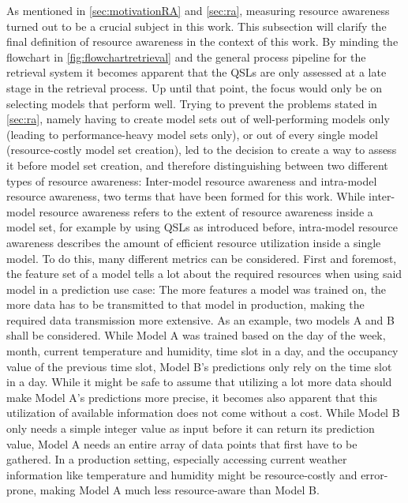 As mentioned in \autoref{sec:motivationRA} and \autoref{sec:ra}, measuring resource awareness turned out to be a crucial subject in this work. This subsection will clarify the final definition of resource awareness in the context of this work. By minding the flowchart in \autoref{fig:flowchartretrieval} and the general process pipeline for the retrieval system it becomes apparent that the QSLs are only assessed at a late stage in the retrieval process. Up until that point, the focus would only be on selecting models that perform well. Trying to prevent the problems stated in \autoref{sec:ra}, namely having to create model sets out of well-performing models only (leading to performance-heavy model sets only), or out of every single model (resource-costly model set creation), led to the decision to create a way to assess it before model set creation, and therefore distinguishing between two different types of resource awareness: Inter-model resource awareness and intra-model resource awareness, two terms that have been formed for this work. While inter-model resource awareness refers to the extent of resource awareness inside a model set, for example by using QSLs as introduced before, intra-model resource awareness describes the amount of efficient resource utilization inside a single model. To do this, many different metrics can be considered. First and foremost, the feature set of a model tells a lot about the required resources when using said model in a prediction use case: The more features a model was trained on, the more data has to be transmitted to that model in production, making the required data transmission more extensive. As an example, two models A and B shall be considered. While Model A was trained based on the day of the week, month, current temperature and humidity, time slot in a day, and the occupancy value of the previous time slot, Model B's predictions only rely on the time slot in a day. While it might be safe to assume that utilizing a lot more data should make Model A's predictions more precise, it becomes also apparent that this utilization of available information does not come without a cost. While Model B only needs a simple integer value as input before it can return its prediction value, Model A needs an entire array of data points that first have to be gathered. In a production setting, especially accessing current weather information like temperature and humidity might be resource-costly and error-prone, making Model A much less resource-aware than Model B. 

